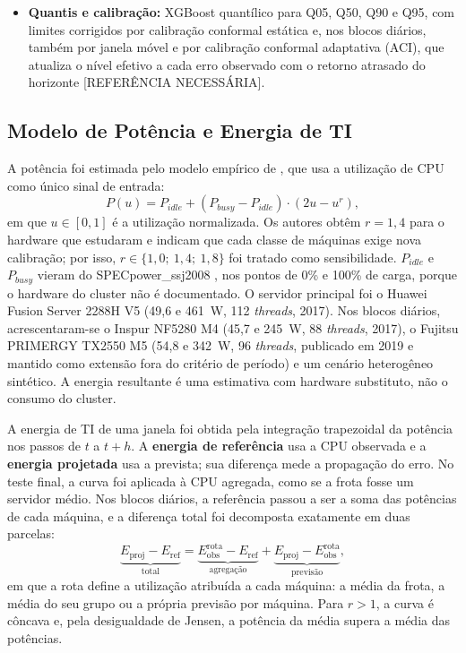 \documentclass[a4paper,12pt]{article}
\newcommand{\refnec}{[REFERÊNCIA NECESSÁRIA]}
\begin{document}
\begin{itemize}
    \item \textbf{Quantis e calibração:} XGBoost quantílico para Q05, Q50, Q90 e Q95, com limites corrigidos por calibração conformal estática e, nos blocos diários, também por janela móvel e por calibração conformal adaptativa (ACI), que atualiza o nível efetivo a cada erro observado com o retorno atrasado do horizonte \refnec.
\end{itemize}

\subsection{Modelo de Potência e Energia de TI}
\label{sec:modelo-potencia}

A potência foi estimada pelo modelo empírico de , que usa a utilização de CPU como único sinal de entrada:
\begin{equation}
P(u) = P_{idle} + (P_{busy} - P_{idle}) \cdot (2u - u^{r}),
\label{eq:fan}
\end{equation}
em que $u \in [0,1]$ é a utilização normalizada. Os autores obtêm $r = 1{,}4$ para o hardware que estudaram e indicam que cada classe de máquinas exige nova calibração; por isso, $r \in \{1{,}0;\ 1{,}4;\ 1{,}8\}$ foi tratado como sensibilidade. $P_{idle}$ e $P_{busy}$ vieram do SPECpower\_ssj2008 \cite{spec2008power}, nos pontos de 0\% e 100\% de carga, porque o hardware do cluster não é documentado. O servidor principal foi o Huawei Fusion Server 2288H V5 (49,6 e 461~W, 112 \textit{threads}, 2017). Nos blocos diários, acrescentaram-se o Inspur NF5280 M4 (45,7 e 245~W, 88 \textit{threads}, 2017), o Fujitsu PRIMERGY TX2550 M5 (54,8 e 342~W, 96 \textit{threads}, publicado em 2019 e mantido como extensão fora do critério de período) e um cenário heterogêneo sintético. A energia resultante é uma estimativa com hardware substituto, não o consumo do cluster.

A energia de TI de uma janela foi obtida pela integração trapezoidal da potência nos passos de $t$ a $t+h$. A \textbf{energia de referência} usa a CPU observada e a \textbf{energia projetada} usa a prevista; sua diferença mede a propagação do erro. No teste final, a curva foi aplicada à CPU agregada, como se a frota fosse um servidor médio. Nos blocos diários, a referência passou a ser a soma das potências de cada máquina, e a diferença total foi decomposta exatamente em duas parcelas:
\begin{equation}
\underbrace{E_{\mathrm{proj}} - E_{\mathrm{ref}}}_{\text{total}} = \underbrace{E_{\mathrm{obs}}^{\mathrm{rota}} - E_{\mathrm{ref}}}_{\text{agregação}} + \underbrace{E_{\mathrm{proj}} - E_{\mathrm{obs}}^{\mathrm{rota}}}_{\text{previsão}},
\label{eq:decomposicao}
\end{equation}
em que a rota define a utilização atribuída a cada máquina: a média da frota, a média do seu grupo ou a própria previsão por máquina. Para $r > 1$, a curva é côncava e, pela desigualdade de Jensen, a potência da média supera a média das potências.
\end{document}
